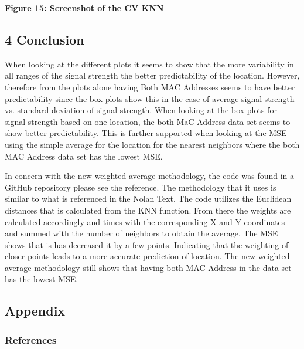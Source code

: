 \documentclass[11pt]{article}
\begin{document}
\textbf{Figure 15: Screenshot of the CV KNN}

    \subsection{4 Conclusion}\label{conclusion}

    When looking at the different plots it seems to show that the more
variability in all ranges of the signal strength the better
predictability of the location. However, therefore from the plots alone
having Both MAC Addresses seems to have better predictability since the
box plots show this in the case of average signal strength vs. standard
deviation of signal strength. When looking at the box plots for signal
strength based on one location, the both MaC Address data set seems to
show better predictability. This is further supported when looking at
the MSE using the simple average for the location for the nearest
neighbors where the both MAC Address data set has the lowest MSE.

In concern with the new weighted average methodology, the code was found
in a GitHub repository please see the reference. The methodology that it
uses is similar to what is referenced in the Nolan Text. The code
utilizes the Euclidean distances that is calculated from the KNN
function. From there the weights are calculated accordingly and times
with the corresponding X and Y coordinates and summed with the number of
neighbors to obtain the average. The MSE shows that is has decreased it
by a few points. Indicating that the weighting of closer points leads to
a more accurate prediction of location. The new weighted average
methodology still shows that having both MAC Address in the data set has
the lowest MSE.

    

    \subsection{Appendix}\label{appendix}

    \subsubsection{References}\label{references}
\end{document}

